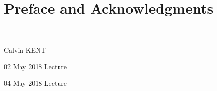 \documentclass[11pt]{book} %
\begin{document}
	\renewcommand*{\Term}{Term 201x} %
	\renewcommand*{\CourseCode}{MATH 000} %
	\renewcommand*{\CourseName}{Course Name} %
	\renewcommand*{\ProfName}{ProfFName ProfLName} %
	\renewcommand*{\LDate}{00 MONTH 201x} %
	\renewcommand*{\COlink}{http://www.student.math.uwaterloo.ca/~c2kent/} %
	\classtitle
	\pagestyle{plain}
	\section*{Preface and Acknowledgments}
	\CKpreface\\~\\
	\hfill Calvin KENT
	\clearpage
	\pagestyle{Lecture}
	\fancyhfoffset[E,O]{0pt} %
	\begin{comment}
	\end{comment}
\begin{lec}{02 May 2018}
	Lecture
\end{lec}
\begin{lec}{04 May 2018}
	Lecture
\end{lec}
\end{document}
